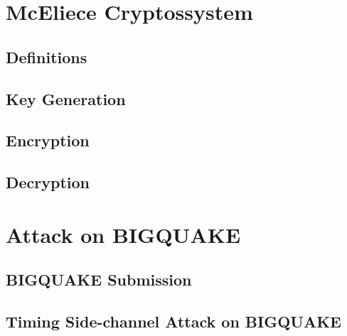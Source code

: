 \section{McEliece Cryptossystem}
\subsection{Definitions}
\subsection{Key Generation}
\subsection{Encryption}
\subsection{Decryption}
\section{Attack on BIGQUAKE}
\subsection{BIGQUAKE Submission}
\subsection{Timing Side-channel Attack on BIGQUAKE}